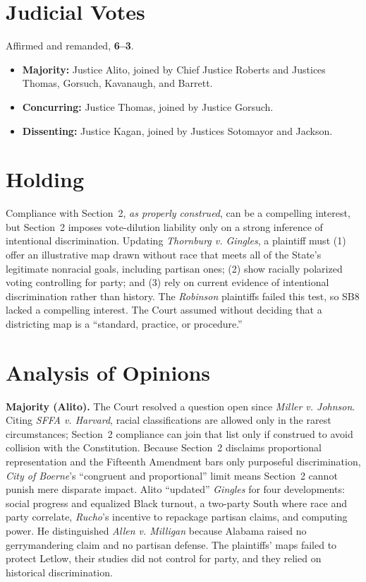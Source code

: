 \documentclass[12pt]{article}
\begin{document}
\section{Judicial Votes}

Affirmed and remanded, \textbf{6--3}.
\begin{itemize}
\item \textbf{Majority:} Justice Alito, joined by Chief Justice Roberts and Justices Thomas, Gorsuch, Kavanaugh, and Barrett.
\item \textbf{Concurring:} Justice Thomas, joined by Justice Gorsuch.
\item \textbf{Dissenting:} Justice Kagan, joined by Justices Sotomayor and Jackson.
\end{itemize}

\section{Holding}

Compliance with Section~2, \textit{as properly construed}, can be a compelling interest, but Section~2 imposes vote-dilution liability only on a strong inference of intentional discrimination. Updating \textit{Thornburg v. Gingles}, a plaintiff must (1) offer an illustrative map drawn without race that meets all of the State's legitimate nonracial goals, including partisan ones; (2) show racially polarized voting controlling for party; and (3) rely on current evidence of intentional discrimination rather than history. The \textit{Robinson} plaintiffs failed this test, so SB8 lacked a compelling interest. The Court assumed without deciding that a districting map is a ``standard, practice, or procedure.''

\section{Analysis of Opinions}

\textbf{Majority (Alito).} The Court resolved a question open since \textit{Miller v. Johnson}. Citing \textit{SFFA v. Harvard}, racial classifications are allowed only in the rarest circumstances; Section~2 compliance can join that list only if construed to avoid collision with the Constitution. Because Section~2 disclaims proportional representation and the Fifteenth Amendment bars only purposeful discrimination, \textit{City of Boerne}'s ``congruent and proportional'' limit means Section~2 cannot punish mere disparate impact. Alito ``updated'' \textit{Gingles} for four developments: social progress and equalized Black turnout, a two-party South where race and party correlate, \textit{Rucho}'s incentive to repackage partisan claims, and computing power. He distinguished \textit{Allen v. Milligan} because Alabama raised no gerrymandering claim and no partisan defense. The plaintiffs' maps failed to protect Letlow, their studies did not control for party, and they relied on historical discrimination.
\end{document}
